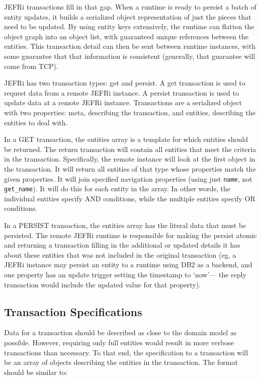 \documentclass{article}
\newcommand{\ilcode}{\tt}
\begin{document}
JEFRi transactions fill in that gap. When a runtime is ready to persist a batch
of entity updates, it builds a serialized object representation of just the
pieces that need to be updated. By using entity keys extensively, the runtime
can flatten the object graph into an object list, with guaranteed unique
references between the entities. This transaction detail can then be sent
between runtime instances, with some guarantee that that information is
consistent (generally, that guarantee will come from TCP).

JEFRi has two transaction types: get and persist. A get transaction is used to
request data from a remote JEFRi instance. A persist transaction is used to
update data at a remote JEFRi instance. Transactions are a serialized object
with two properties: meta, describing the transaction, and entities, describing
the entities to deal with.

In a GET transaction, the entities array is a template for which entities should
be returned. The return transaction will contain all entities that meet the
criteria in the transaction. Specifically, the remote instance will look at the
first object in the transaction. It will return all entities of that type whose
properties match the given properties. It will join specified navigation
properties (using just {\ilcode name}, not {\ilcode get\_name}). It will do this
for each entity in the array. In other words, the individual entities specify
AND conditions, while the multiple entities specify OR conditions.

In a PERSIST transaction, the entities array has the literal data that must be
persisted. The remote JEFRi runtime is responsible for making the persist atomic
and returning a transaction filling in the additional or updated details it has
about these entities that was not included in the original transaction (eg, a
JEFRi instance may persist an entity to a runtime using DB2 as a backend, and
one property has an update trigger setting the timestamp to `now'--- the reply
transaction would include the updated value for that property).

\subsection{Transaction Specifications}

Data for a transaction should be described as close to the domain model as
possible. However, requiring only full entities would result in more verbose
transactions than necessary. To that end, the specification to a transaction
will be an array of objects describing the entities in the transaction. The
format should be similar to:
\end{document}
